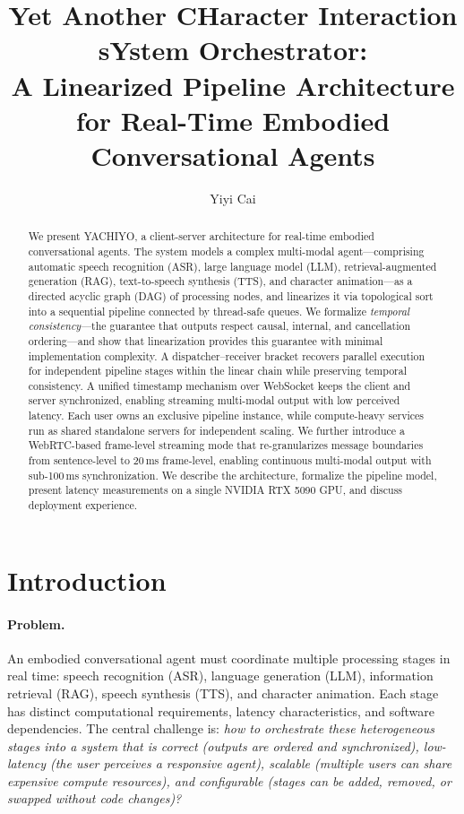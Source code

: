 \documentclass[11pt,a4paper]{article}
\title{Yet Another CHaracter Interaction sYstem Orchestrator:\\A Linearized Pipeline Architecture for Real-Time Embodied Conversational Agents}
\author{Yiyi Cai}
\date{}
\begin{document}
\maketitle

\begin{abstract}
We present YACHIYO, a client-server architecture for real-time embodied conversational agents. The system models a complex multi-modal agent---comprising automatic speech recognition (ASR), large language model (LLM), retrieval-augmented generation (RAG), text-to-speech synthesis (TTS), and character animation---as a directed acyclic graph (DAG) of processing nodes, and linearizes it via topological sort into a sequential pipeline connected by thread-safe queues. We formalize \emph{temporal consistency}---the guarantee that outputs respect causal, internal, and cancellation ordering---and show that linearization provides this guarantee with minimal implementation complexity. A dispatcher--receiver bracket recovers parallel execution for independent pipeline stages within the linear chain while preserving temporal consistency. A unified timestamp mechanism over WebSocket keeps the client and server synchronized, enabling streaming multi-modal output with low perceived latency. Each user owns an exclusive pipeline instance, while compute-heavy services run as shared standalone servers for independent scaling. We further introduce a WebRTC-based frame-level streaming mode that re-granularizes message boundaries from sentence-level to 20\,ms frame-level, enabling continuous multi-modal output with sub-100\,ms synchronization. We describe the architecture, formalize the pipeline model, present latency measurements on a single NVIDIA RTX 5090 GPU, and discuss deployment experience.
\end{abstract}

\section{Introduction}
\label{sec:introduction}

\paragraph{Problem.}
An embodied conversational agent must coordinate multiple processing stages in real time: speech recognition (ASR), language generation (LLM), information retrieval (RAG), speech synthesis (TTS), and character animation. Each stage has distinct computational requirements, latency characteristics, and software dependencies. The central challenge is: \emph{how to orchestrate these heterogeneous stages into a system that is correct (outputs are ordered and synchronized), low-latency (the user perceives a responsive agent), scalable (multiple users can share expensive compute resources), and configurable (stages can be added, removed, or swapped without code changes)?}
\end{document}
